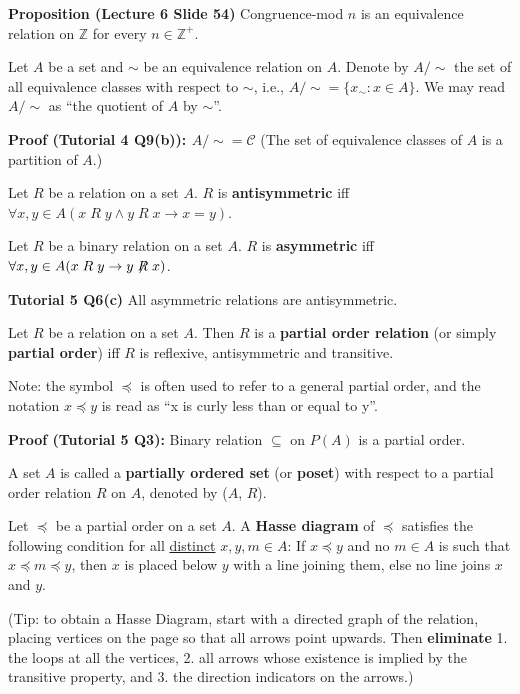 \documentclass{article}
\begin{document}
\begin{description}
	\item \qquad \textbf{Proposition (Lecture 6 Slide 54)} Congruence-mod $n$ is an equivalence relation on $\mathbb{Z}$ for every $n\in \mathbb{Z}^{+}$.
	\item[Set of equivalence classes]Let $A$ be a set and $\sim$ be an equivalence relation on $A$. Denote by $A/{\sim}$ the set of all equivalence classes with respect to $\sim$, i.e., $A/{\sim}=\{x_{\sim}:x\in A\}$. We may read $A/{\sim}$ as “the quotient of $A$ by $\sim$”.
	\item \qquad \textbf{Proof (Tutorial 4 Q9(b)): $A/{\sim} = \mathscr{C}$} (The set of equivalence classes of $A$ is a partition of $A$.)
	\item[Antisymmetry] Let $R$ be a relation on a set $A$. $R$ is \textbf{antisymmetric} iff $\forall x,y\in A(x\;R\;y\land y\;R\;x \to x=y)$.
	\item[Asymmetry (Tutorial 5 Q6)] Let $R$ be a binary relation on a set $A$. $R$ is \textbf{asymmetric} iff $\forall x, y\in A (x\;R\;y \to y\;{\not}R\; x)$.
	\item \qquad \textbf{Tutorial 5 Q6(c)} All asymmetric relations are antisymmetric.
	\item[Partial Order Relations] Let $R$ be a relation on a set $A$. Then $R$ is a \textbf{partial order relation} (or simply \textbf{partial order}) iff $R$ is reflexive, antisymmetric and transitive.
	\item \qquad Note: the symbol $\preceq$ is often used to refer to a general partial order, and the notation $x\preceq y$ is read as ``x is curly less than or equal to y''.
	\item \qquad \textbf{Proof (Tutorial 5 Q3):} Binary relation $\subseteq$ on $P(A)$ is a partial order.
	\item[Partially Ordered Sets]A set $A$ is called a \textbf{partially ordered set} (or \textbf{poset}) with respect to a partial order relation $R$ on $A$, denoted by ($A$, $R$).
	\item[Hasse Diagram]Let $\preceq$ be a partial order on a set $A$. A \textbf{Hasse diagram} of $\preceq$ satisfies the following condition for all \underline{distinct} $x,y,m\in A$: If $x\preceq y$ and no $m \in A$ is such that $x\preceq m\preceq y$, then $x$ is placed below $y$ with a line joining them, else no line joins $x$ and $y$.
	\item \qquad (Tip: to obtain a Hasse Diagram, start with a directed graph of the relation, placing vertices on the page so that all arrows point upwards. Then \textbf{eliminate} 1. the loops at all the vertices, 2. all arrows whose existence is implied by the transitive property, and 3. the direction indicators on the arrows.)

\end{description}
\end{document}
